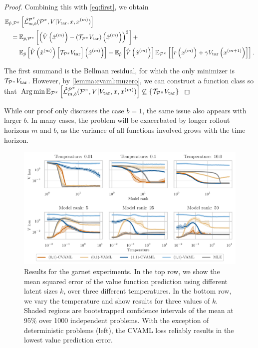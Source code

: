 \begin{proof}
Combining this with \autoref{eq:first}, we obtain
\begin{align}
  &\EEX{\hat{p},\P^\pi}{\hat{\mathcal{L}}^{\P^\pi}_{m,b}(\P^\pi, V| V_{\mathrm{tar}}, x, x^{(m)})}\\
  &\quad = \EEX{\hat{p},\P^\pi}{ \roundb{\hat{V}\roundb{\mx{m}} - \roundb{\mathcal{T}_{\P^\pi}V_\mathrm{tar}}\roundb{\mx{m}}}^2} + \\
  &~ \quad \quad \EEX{\hat{p}}{ \hat{V}\roundb{\mx{m}}\target{m}} - \EEX{\hat{p}}{\hat{V}\roundb{\mx{m}}} \EEX{\P^\pi}{\TrV{m}}.
\end{align}

The first summand is the Bellman residual, for which the only minimizer is $\mathcal{T}_{\P^\pi}V_\mathrm{tar}$.
However, by \autoref{lemma:cvaml:muzero}, we can construct a function class so that $\Argmin \EEX{\P^\pi}{\hat{\mathcal{L}}^{\P^\pi}_{m,b}(\P^\pi, V| V_{\mathrm{tar}}, x, x^{(m)})} \not \subseteq \{\mathcal{T}_{\P^\pi}V_\mathrm{tar}\}$
\end{proof}

While our proof only discusses the case $b=1$, the same issue also appears with larger $b$.
In many cases, the problem will be exacerbated by longer rollout horizons $m$ and $b$, as the variance of all functions involved grows with the time horizon.


\begin{figure}[t]
    \centering
    \includegraphics[width=.9\linewidth]{figures/lambda/plts/v_loss_comparison.pdf}
    \caption{Results for the garnet experiments. 
    In the top row, we show the mean squared error of the value function prediction using different latent sizes $k$, over three different temperatures. 
    In the bottom row, we vary the temperature and show results for three values of $k$. 
    Shaded regions are bootstrapped confidence intervals of the mean at 95\% over 1000 independent problems. 
    With the exception of deterministic problems (left), the CVAML loss reliably results in the lowest value prediction error. }
    \label{fig:cvaml:garnet}
\end{figure}

